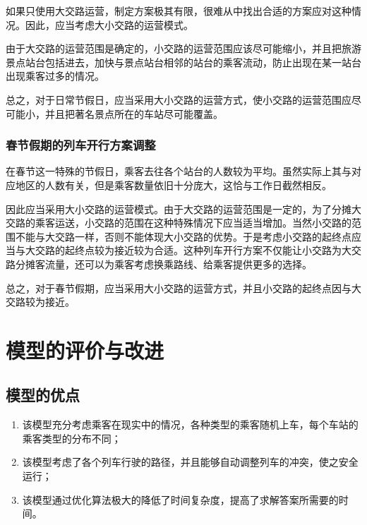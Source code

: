 如果只使用大交路运营，制定方案极其有限，很难从中找出合适的方案应对这种情况。因此，应当考虑大小交路的运营模式。

由于大交路的运营范围是确定的，小交路的运营范围应该尽可能缩小，并且把旅游景点站台包括进去，加快与景点站台相邻的站台的乘客流动，防止出现在某一站台出现乘客过多的情况。

总之，对于日常节假日，应当采用大小交路的运营方式，使小交路的运营范围应尽可能小，并且把著名景点所在的车站尽可能覆盖。

\subsubsection{春节假期的列车开行方案调整}

在春节这一特殊的节假日，乘客去往各个站台的人数较为平均。虽然实际上其与对应地区的人数有关，但是乘客数量依旧十分庞大，这恰与工作日截然相反。

因此应当采用大小交路的运营模式。由于大交路的运营范围是一定的，为了分摊大交路的乘客运送，小交路的范围在这种特殊情况下应当适当增加。当然小交路的范围不能与大交路一样，否则不能体现大小交路的优势。于是考虑小交路的起终点应当与大交路的起终点较为接近较为合适。这种列车开行方案不仅能让小交路为大交路分摊客流量，还可以为乘客考虑换乘路线、给乘客提供更多的选择。

总之，对于春节假期，应当采用大小交路的运营方式，并且小交路的起终点因与大交路较为接近。


%
%

\section{模型的评价与改进}

\subsection{模型的优点}

\begin{enumerate}
    \item 该模型充分考虑乘客在现实中的情况，各种类型的乘客随机上车，每个车站的乘客类型的分布不同；
    \item 该模型考虑了各个列车行驶的路径，并且能够自动调整列车的冲突，使之安全运行；
    \item 该模型通过优化算法极大的降低了时间复杂度，提高了求解答案所需要的时间。
\end{enumerate}

